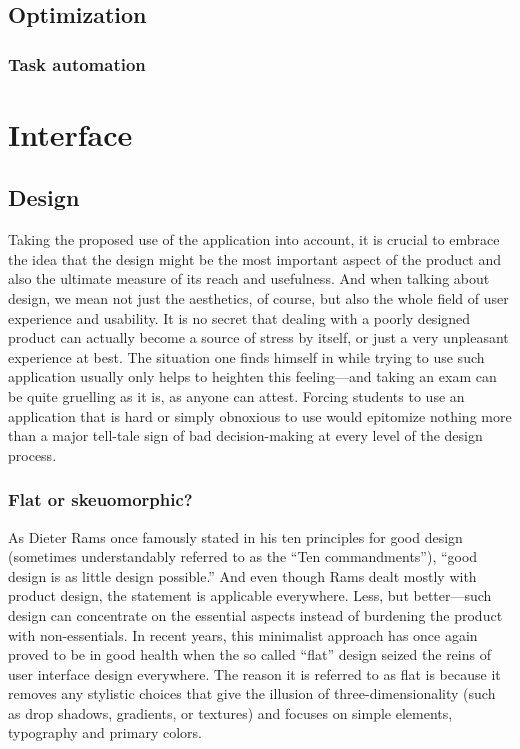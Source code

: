 \documentclass[thesis=M,english,hidelinks]{FITthesis}[2012/10/20]
\begin{document}
  \subsection{Optimization}

    \subsubsection{Task automation}

\section{Interface}

  \subsection{Design}

Taking the proposed use of the application into account, it is crucial to embrace the idea that the design might be the most important aspect of the product and also the ultimate measure of its reach and usefulness. And when talking about design, we mean not just the aesthetics, of course, but also the whole field of user experience and usability. It is no secret that dealing with a poorly designed product can actually become a source of stress by itself, or just a very unpleasant experience at best. The situation one finds himself in while trying to use such application usually only helps to heighten this feeling---and taking an exam can be quite gruelling as it is, as anyone can attest. Forcing students to use an application that is hard or simply obnoxious to use would epitomize nothing more than a major tell-tale sign of bad decision-making at every level of the design process.

    \subsubsection{Flat or skeuomorphic?}

As Dieter Rams once famously stated in his ten principles for good design (sometimes understandably referred to as the ``Ten commandments''), ``good design is as little design possible.'' And even though Rams dealt mostly with product design, the statement is applicable everywhere. Less, but better---such design can concentrate on the essential aspects instead of burdening the product with non-essentials. In recent years, this minimalist approach has once again proved to be in good health when the so called ``flat'' design seized the reins of user interface design everywhere. The reason it is referred to as flat is because it removes any stylistic choices that give the illusion of three-dimensionality (such as drop shadows, gradients, or textures) and focuses on simple elements, typography and primary colors.
\end{document}
